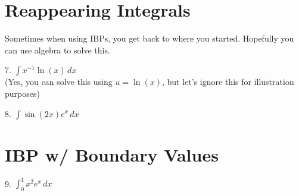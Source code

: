 \documentclass[paper=a4, fontsize=11pt]{scrartcl} %
\numberwithin{equation}{section} %
\numberwithin{figure}{section} %
\numberwithin{table}{section} %
\begin{document}
\section*{Reappearing Integrals}

Sometimes when using IBPs, you get back to where you started.  Hopefully you can use algebra to solve this.\newline\newline

7. \quad $\displaystyle \int x^{-1}\ln(x)\,dx$\\
(Yes, you can solve this using $u = \ln(x)$, but let's ignore this for illustration purposes)

\vfill

8. \quad $\displaystyle \int \sin(2x)e^x\,dx$

\vfill

\section*{IBP w/ Boundary Values}

9. \quad $\displaystyle \int_0^1 x^2 e^x\,dx$
\vfill
\end{document}
